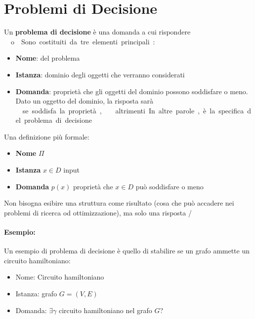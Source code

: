 \section{Problemi di Decisione}

Un \textbf{problema di decisione} è una domanda a cui rispondere \si\ o \no. Sono costituiti da tre elementi principali:
\begin{itemize}
	\item \textbf{Nome}: del problema
    
	\item \textbf{Istanza}: dominio degli oggetti che verranno considerati
	
    \item \textbf{Domanda}: proprietà che gli oggetti del dominio possono soddisfare o meno. Dato un oggetto del dominio, la risposta sarà \si\ se soddisfa la proprietà, \no\ altrimenti. In altre parole, è la specifica del problema di decisione
\end{itemize}

Una definizione più formale:
\begin{itemize}
	\item \textbf{Nome} $\Pi$
	
    \item \textbf{Istanza} $x \in D$ input
	
    \item \textbf{Domanda} $p(x)$ proprietà che $x \in D$ può soddisfare o meno
\end{itemize}

Non bisogna esibire una struttura come risultato (cosa che può accadere nei problemi di ricerca od ottimizzazione), ma solo una risposta \si/\no.

\vspace{-1em}

\paragraph{Esempio:} Un esempio di problema di decisione è quello di stabilire se un grafo ammette un circuito hamiltoniano:
\begin{itemize}
	\item Nome: Circuito hamiltoniano
	
    \item Istanza: grafo $G = (V,E)$
	
    \item Domanda: $\exists \gamma$ circuito hamiltoniano nel grafo $G$?
\end{itemize} 


